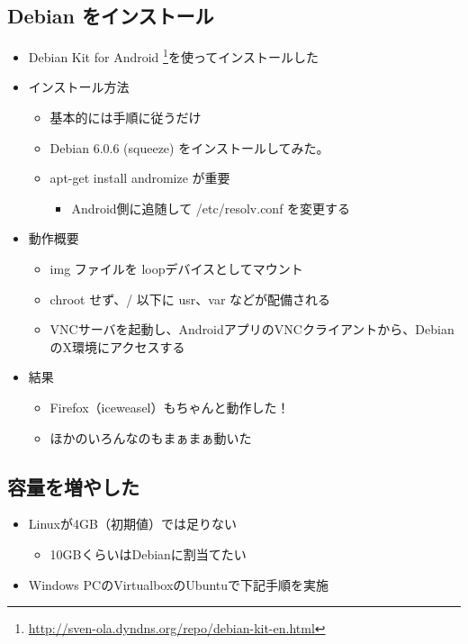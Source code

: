 \documentclass[mingoth,a4paper]{jsarticle}
\begin{document}
\subsection{Debian をインストール}
  \begin{itemize}
   \item Debian Kit for Android \footnote{\url{http://sven-ola.dyndns.org/repo/debian-kit-en.html}}を使ってインストールした
   \item インストール方法
         \begin{itemize}
          \item 基本的には手順に従うだけ
          \item Debian 6.0.6 (squeeze) をインストールしてみた。
          \item apt-get install andromize が重要
                \begin{itemize}
                 \item Android側に追随して /etc/resolv.conf を変更する
                \end{itemize}
         \end{itemize}
   \item 動作概要

   \begin{itemize}
    \item img ファイルを loopデバイスとしてマウント
    \item chroot せず、/ 以下に usr、var などが配備される
    \item VNCサーバを起動し、AndroidアプリのVNCクライアントから、DebianのX環境にアクセスする
   \end{itemize}
   \item 結果
         \begin{itemize}
          \item Firefox（iceweasel）もちゃんと動作した！
          \item ほかのいろんなのもまぁまぁ動いた
         \end{itemize}
  \end{itemize}

\subsection{容量を増やした}
\begin{itemize}
 \item Linuxが4GB（初期値）では足りない
       \begin{itemize}
        \item 10GBくらいはDebianに割当てたい
       \end{itemize}
 \item Windows PCのVirtualboxのUbuntuで下記手順を実施
\end{itemize}
\end{document}

